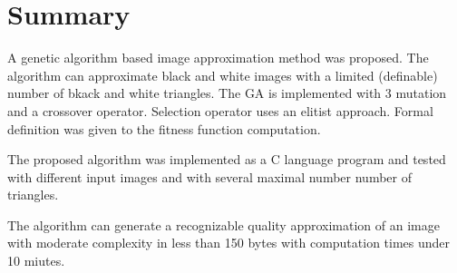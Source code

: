 \documentclass[conference]{IEEEtran}
\begin{document}
\section{Summary}

A genetic algorithm based image approximation method
was proposed. The algorithm can approximate black and
white images with a limited (definable) number of
bkack and white triangles. The GA is implemented
with 3 mutation and a crossover operator. Selection
operator uses an elitist approach. Formal definition
was given to the fitness function computation.

The proposed algorithm was implemented as a C
language program and tested with different input
images and with several maximal number number
of triangles.

The algorithm can generate a recognizable quality
approximation of an image with moderate complexity
in less than 150 bytes with computation times
under 10 miutes.
\end{document}
